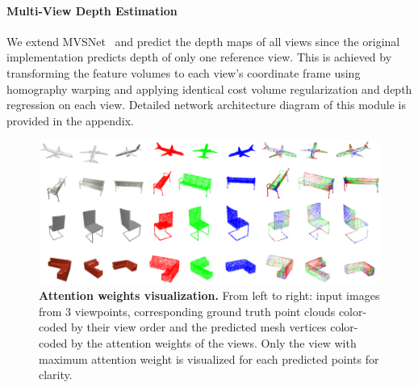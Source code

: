 \label{subsec:depth_prediction}
\paragraph{Multi-View Depth Estimation}
We extend MVSNet~\cite{yao2018mvsnet} and predict the depth maps of all views since the original implementation predicts depth of only one reference view.
This is achieved by transforming the feature volumes to each view's coordinate frame using homography warping
and applying identical cost volume regularization and depth regression on each view.
Detailed network architecture diagram of this module is provided in the appendix.



\begin{figure}[t]
\begin{center}
\includegraphics[width=\linewidth]{imgs/attention_weights_visualization.png}
\end{center}
\vspace{-4mm}
    \caption{
        \textbf{Attention weights visualization.}
        From left to right: input images from 3 viewpoints, corresponding ground truth point clouds color-coded by their view order and the predicted mesh vertices color-coded by the attention weights of the views.
        Only the view with maximum attention weight is visualized for each predicted points for clarity.
    }
\vspace{-4mm}
\label{fig:attention_weights}
\end{figure}

\vspace{-4mm}
